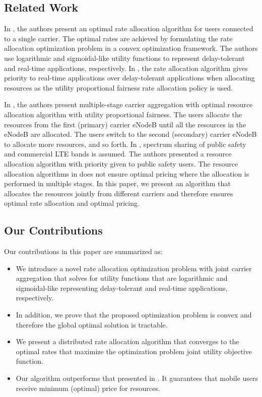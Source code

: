 \documentclass[conference]{IEEEtran}
\begin{document}
\subsection{Related Work}\label{sec:related}

In \cite{Ahmed_Utility1, Ahmed_Utility2, Ahmed_Utility3}, the authors present an optimal rate allocation algorithm for users connected to a single carrier. The optimal rates are achieved by formulating the rate allocation optimization problem in a convex optimization framework. The authors use logarithmic and sigmoidal-like utility functions to represent delay-tolerant and real-time applications, respectively. In \cite{Ahmed_Utility1}, the rate allocation algorithm gives priority to real-time applications over delay-tolerant applications when allocating resources as the utility proportional fairness rate allocation policy is used. 

In \cite{Haya_Utility1}, the authors present multiple-stage carrier aggregation with optimal resource allocation algorithm with utility proportional fairness. The users allocate the resources from the first (primary) carrier eNodeB until all the resources in the eNodeB are allocated. The users switch to the second (secondary) carrier eNodeB to allocate more resources, and so forth. In \cite{Haya_Utility2}, spectrum sharing of public safety and commercial LTE bands is assumed. The authors presented a resource allocation algorithm with priority given to public safety users. The resource allocation algorithms in \cite{Haya_Utility1,Haya_Utility2} does not ensure optimal pricing where the allocation is performed in multiple stages. In this paper, we present an algorithm that allocates the resources jointly from different carriers and therefore ensures optimal rate allocation and optimal pricing.  

\subsection{Our Contributions}\label{sec:contributions}
Our contributions in this paper are summarized as:
\begin{itemize}
\item We introduce a novel rate allocation optimization problem with joint carrier aggregation that solves for utility functions that are logarithmic and sigmoidal-like representing delay-tolerant and real-time applications, respectively. 
\item In addition, we prove that the proposed optimization problem is convex and therefore the global optimal solution is tractable. \item We present a distributed rate allocation algorithm that converges to the optimal rates that maximize the optimization problem joint utility objective function. 
\item Our algorithm outperforms that presented in \cite{Haya_Utility1,Haya_Utility2}. It guarantees that mobile users receive minimum (optimal) price for resources. \end{itemize}
\end{document}
